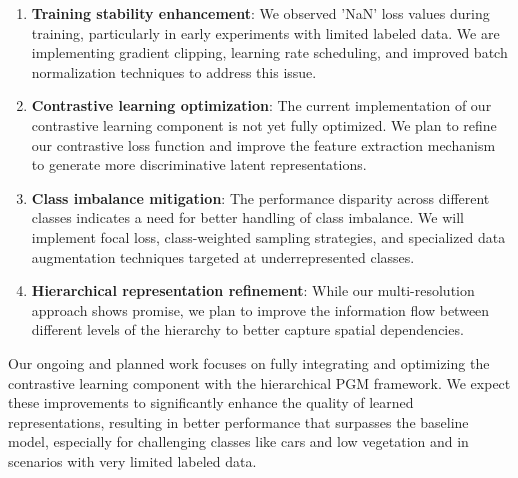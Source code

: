 \documentclass[conference]{IEEEtran}
\begin{document}
\begin{enumerate}
    \item \textbf{Training stability enhancement}: We observed 'NaN' loss values during training, particularly in early experiments with limited labeled data. We are implementing gradient clipping, learning rate scheduling, and improved batch normalization techniques to address this issue.

    \item \textbf{Contrastive learning optimization}: The current implementation of our contrastive learning component is not yet fully optimized. We plan to refine our contrastive loss function and improve the feature extraction mechanism to generate more discriminative latent representations.

    \item \textbf{Class imbalance mitigation}: The performance disparity across different classes indicates a need for better handling of class imbalance. We will implement focal loss, class-weighted sampling strategies, and specialized data augmentation techniques targeted at underrepresented classes.

    \item \textbf{Hierarchical representation refinement}: While our multi-resolution approach shows promise, we plan to improve the information flow between different levels of the hierarchy to better capture spatial dependencies.

\end{enumerate}

Our ongoing and planned work focuses on fully integrating and optimizing the contrastive learning component with the hierarchical PGM framework. We expect these improvements to significantly enhance the quality of learned representations, resulting in better performance that surpasses the baseline model, especially for challenging classes like cars and low vegetation and in scenarios with very limited labeled data.



\end{document}
